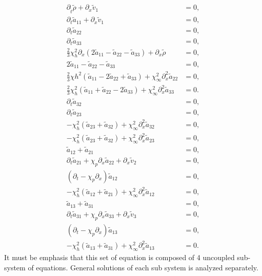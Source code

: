 \documentclass[
10pt, %
a4paper, %
oneside, %
headinclude,footinclude, %
table
]{scrartcl}
\begin{document}
\begin{subequations}\label{SysStatTT}
\begin{align}
\label{SysStat1}	\partial_{\tilde{t}}\tilde{\rho}+\partial_{x}{\tilde{v}_1}&=0,\\   
\label{SysStat5}	\partial_{t}{\tilde{a}_{11}}+\partial_{x}{\tilde{v}_1}&=0,\\   
\label{SysStat9}	\partial_{t}{\tilde{a}_{22}}&=0,\\   
\label{SysStat13}	\partial_{t}{\tilde{a}_{33}}&=0,\\   
\label{SysStat2}	\frac{2}{3} \chi _h^2 \partial_{x}\left(2  \tilde{a}_{11}-\tilde{a}_{22}-\tilde{a}_{33}\right)+\partial_{x}{\tilde{\rho }}&=0,\\   
\label{SysStat23}	2\tilde{a}_{11}-\tilde{a}_{22}-\tilde{a}_{33}&=0,\\   
\label{SysStat27}	\frac{2}{3} \chi h^2 \left(\tilde{a}_{11}-2\tilde{a}_{22}+\tilde{a}_{33}\right)+\chi _{\infty }^2\partial_{x}^2\tilde{a}_{22}&=0,\\   
\label{SysStat31}	\frac{2}{3}\chi _h^2\left(\tilde{a}_{11}+\tilde{a}_{22}-2 \tilde{a}_{33}\right) +\chi _{\infty }^2\partial_{x}^2\tilde{a}_{33}&=0.\\
\hline
%
\label{SysStat10}	\partial_{t}{\tilde{a}_{32}} &=0,\\   
\label{SysStat12}	\partial_{t}{\tilde{a}_{23}} &=0,\\   
\label{SysStat28}	-\chi _h^2\left(\tilde{a}_{23}+\tilde{a}_{32}\right) +\chi _{\infty}^2\partial_{x}^2\tilde{a}_{32}&=0,\\   
\label{SysStat30}	- \chi _h^2\left(\tilde{a}_{23}+\tilde{a}_{32}\right)+\chi _{\infty}^2 \partial_{x}^2\tilde{a}_{23}&=0, \\
\hline
%
\label{SysStat3}	\tilde{a}_{12}+\tilde{a}_{21}&=0,\\   
\label{SysStat6}	\partial_{t}{\tilde{a}_{21}}+\chi _p\partial_{x}\tilde{a}_{22} +\partial_{x}{\tilde{v}_2}&=0,\\   
\label{SysStat8}	(\partial_{t}-\chi_p\partial_{x})\tilde{a}_{12} &=0,\\   
\label{SysStat26}	- \chi _h^2\left(\tilde{a}_{12}+\tilde{a}_{21}\right)+\chi _{\infty }^2\partial_{x}^2\tilde{a}_{12}&=0,\\   
\hline
%
\label{SysStat4}	\tilde{a}_{13}+\tilde{a}_{31}&=0,\\   
\label{SysStat7}	\partial_{t}{\tilde{a}_{31}}+\chi _p\partial_{x}\tilde{a}_{33}+\partial_{x}{\tilde{v}_3}&=0,\\   
\label{SysStat11}	(\partial_{t}-\chi_p\partial_{x})\tilde{a}_{13} &=0,\\   
\label{SysStat29}	-\chi _h^2\left(\tilde{a}_{13}+\tilde{a}_{31}\right)+\chi _{\infty }^2 \partial_{x}^2\tilde{a}_{13}&=0.
 \end{align} 
 \end{subequations}
It must be emphasis that this set of equation is composed of 4 uncoupled sub-system of equations. General solutions of each sub system is analyzed separately. 
\end{document}
